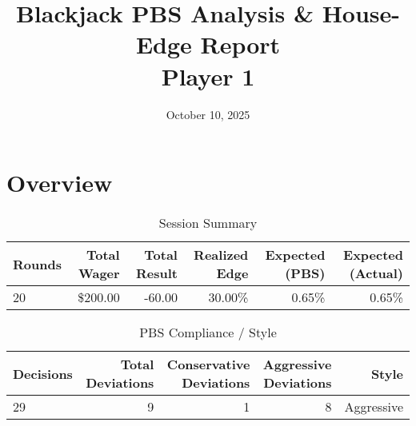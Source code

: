 \documentclass[11pt]{article}
\title{Blackjack PBS Analysis \& House-Edge Report \\ {\large Player 1}}
\date{October 10, 2025}
\begin{document}
\maketitle
\section*{Overview}
\begin{table}[ht]
\centering
\caption{Session Summary}
\label{tab:session_p1}
\begin{tabular}{l | r | r | r | r | r}
\hline
Rounds & Total Wager & Total Result & Realized Edge & Expected (PBS) & Expected (Actual) \\ \hline
20 & \$200.00 & -60.00 & 30.00\% & 0.65\% & 0.65\% \\
\hline
\end{tabular}
\end{table}
\begin{table}[ht]
\centering
\caption{PBS Compliance / Style}
\label{tab:style_p1}
\begin{tabular}{l | r | r | r | r}
\hline
Decisions & Total Deviations & Conservative Deviations & Aggressive Deviations & Style \\ \hline
29 & 9 & 1 & 8 & Aggressive \\
\hline
\end{tabular}
\end{table}
\end{document}

